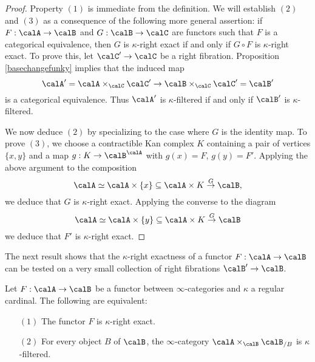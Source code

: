 \begin{proof}
Property $(1)$ is immediate from the definition. We will establish $(2)$ and $(3)$ as a consequence of the following more general assertion: if $F: \calA \rightarrow \calB$ and $G: \calB \rightarrow \calC$ are functors such that $F$ is a categorical equivalence, then $G$ is $\kappa$-right exact if and only if $G \circ F$ is $\kappa$-right exact. To prove this, let $\calC' \rightarrow \calC$ be a right fibration. Proposition \ref{basechangefunky} implies that the induced map
$$ \calA' = \calA \times_{\calC} \calC' \rightarrow \calB \times_{\calC} \calC' = \calB'$$
is a categorical equivalence. Thus $\calA'$ is $\kappa$-filtered if and only if $\calB'$ is $\kappa$-filtered.

We now deduce $(2)$ by specializing to the case where $G$ is the identity map. To prove $(3)$,
we choose a contractible Kan complex $K$ containing a pair of vertices $\{x,y\}$ and a map $g: K \rightarrow \calB^{\calA}$ with $g(x) = F$, $g(y) = F'$. Applying the above argument to the composition
$$ \calA \simeq \calA \times \{x\} \subseteq \calA \times K \stackrel{G}{\rightarrow} \calB,$$
we deduce that $G$ is $\kappa$-right exact. Applying the converse to the diagram
$$ \calA \simeq \calA \times \{y\} \subseteq \calA \times K \stackrel{G}{\rightarrow} \calB$$
we deduce that $F'$ is $\kappa$-right exact.
\end{proof}

The next result shows that the $\kappa$-right exactness of a functor $F: \calA \rightarrow \calB$ can be tested on a very small collection of right fibrations $\calB' \rightarrow \calB$.

\begin{proposition}\label{swarmy}
Let $F: \calA \rightarrow \calB$ be a functor between $\infty$-categories and $\kappa$ a regular cardinal. The following are equivalent:
\begin{itemize}
\item[$(1)$] The functor $F$ is $\kappa$-right exact.
\item[$(2)$] For every object $B$ of $\calB$, the $\infty$-category
$ \calA \times_{\calB} \calB_{/B}$ is $\kappa$-filtered.
\end{itemize}
\end{proposition}

